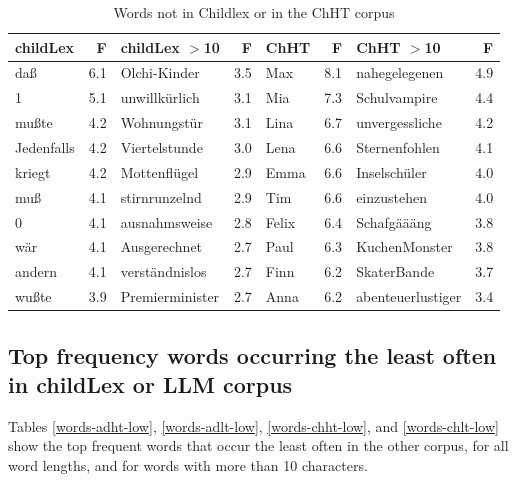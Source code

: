 \documentclass[doc, a4paper, anonymous]{apa7}
\begin{document}
\begin{table}[!htbp]
\caption{Words not in Childlex or in the ChHT corpus}
\centering
\begin{tabular}{lrlrlrlr}
  \hline
childLex & F & childLex $>$10 & F & ChHT & F & ChHT $>$10 & F \\ 
  \hline
daß & 6.1 & Olchi-Kinder & 3.5 & Max & 8.1 & nahegelegenen & 4.9 \\ 
  1 & 5.1 & unwillkürlich & 3.1 & Mia & 7.3 & Schulvampire & 4.4 \\ 
  mußte & 4.2 & Wohnungstür & 3.1 & Lina & 6.7 & unvergessliche & 4.2 \\ 
  Jedenfalls & 4.2 & Viertelstunde & 3.0 & Lena & 6.6 & Sternenfohlen & 4.1 \\ 
  kriegt & 4.2 & Mottenflügel & 2.9 & Emma & 6.6 & Inselschüler & 4.0 \\ 
  muß & 4.1 & stirnrunzelnd & 2.9 & Tim & 6.6 & einzustehen & 4.0 \\ 
  0 & 4.1 & ausnahmsweise & 2.8 & Felix & 6.4 & Schafgäääng & 3.8 \\ 
  wär & 4.1 & Ausgerechnet & 2.7 & Paul & 6.3 & KuchenMonster & 3.8 \\ 
  andern & 4.1 & verständnislos & 2.7 & Finn & 6.2 & SkaterBande & 3.7 \\ 
  wußte & 3.9 & Premierminister & 2.7 & Anna & 6.2 & abenteuerlustiger & 3.4 \\  
   \hline
\end{tabular}
\label{words-chht}
\end{table}

\clearpage

\subsection{Top frequency words occurring the least often in childLex or LLM corpus}

Tables \ref{words-adht-low}, \ref{words-adlt-low}, \ref{words-chht-low}, and \ref{words-chlt-low} show the top frequent words that occur the least often in the other corpus, for all word lengths, and for words with more than 10 characters.
\end{document}
